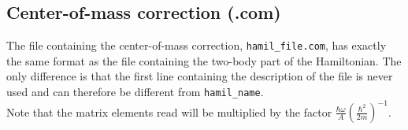 \documentclass[a4paper,11pt]{article}
\renewcommand{\tt}[1]{\texttt{#1}}
\begin{document}
\subsection{Center-of-mass correction (.com)}
The file containing the center-of-mass correction, \tt{hamil\_file.com}, has exactly the same format as the file containing 
the two-body part of the Hamiltonian. The only difference is that the first line containing the description of the file is never used
and can therefore be different from \tt{hamil\_name}. \\
Note that the matrix elements read will be multiplied by the factor $\frac{\hbar \omega}{A} \left( \frac{\hbar^2}{2 m} \right)^{-1}$.

%
%
\end{document}

